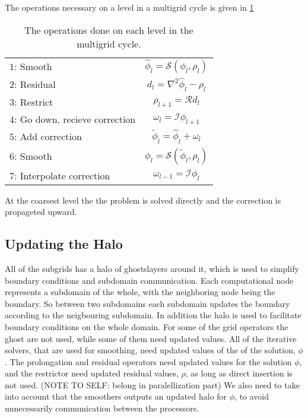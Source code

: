 		The operations necessary on a level in a multigrid cycle is given in \cref{tab:recursive}
		\begin{table}[h]
		\begin{tabular}	{l | c}
			\(1\): Smooth &\( \widehat{\phi}_l = \mathcal{S}(\phi_l, \rho_l)\)
			\\
			\(2\): Residual &	\(d_l = \nabla^2\widehat{\phi}_l - \rho_l\)
			\\
			\(3\): Restrict &\(\rho_{l+1} = \mathcal{R}d_l \) \nonumber
			\\
			\(4\): Go down, recieve correction & \(\omega_l = \mathcal{I} \phi_{l+1}\)
			\\
			\(5\): Add correction	&\(\widetilde{\phi}_l = \widehat{\phi}_l + \omega_l\)
			\\
			\(6\): Smooth	&\(\phi_l = \mathcal{S}(\widetilde{\phi}_l, \rho_l)\)
			\\
			\(7\): Interpolate correction &\( \omega_{l-1} = \mathcal{I} \phi_l\)
		\end{tabular}
		\caption{The operations done on each level in the multigrid cycle.}
		\label{tab:recursive}
		\end{table}

		At the coarsest level the the problem is solved directly and the correction is propageted upward.

		\subsection{Updating the Halo}
		All of the subgrids has a halo of ghostslayers around it, which is used to simplify boundary conditions and subdomain communication. Each computational node
		represents a subdomain of the whole, with the neighboring node being the boundary. So between two subdomains each subdomain updates the boundary according to
		the neigbouring subdomain. In addition the halo is used to facilitate boundary conditions on the whole domain. For some of the grid operators
		the ghost are not used, while some of them need updated values. All of the iterative solvers, that are used
		for smoothing, need updated values of the of the solution, \(\phi\). The prolongation and residual operators need updated values
		for the solution \(\phi\), and the restrictor need updated residual values, \(\rho\), as long as direct insertion is not used. (NOTE TO SELF: belong in paralellization part)
		We also need to take into account that the smoothers outputs an updated halo for \(\phi\), to avoid
		unnecessarily communication between the processors.

